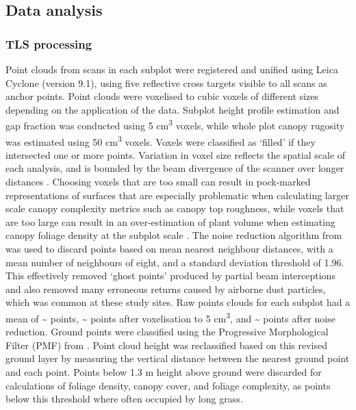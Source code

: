 \documentclass[11pt,a4paper]{article}
\begin{document}
\subsection{Data analysis}

\subsubsection{TLS processing}

Point clouds from scans in each subplot were registered and unified using Leica Cyclone (version 9.1), using five reflective cross targets visible to all scans as anchor points. Point clouds were voxelised to cubic voxels of different sizes depending on the application of the data. Subplot height profile estimation and gap fraction was conducted using 5 cm\textsuperscript{3} voxels, while whole plot canopy rugosity was estimated using 50 cm\textsuperscript{3} voxels. Voxels were classified as `filled' if they intersected one or more points. Variation in voxel size reflects the spatial scale of each analysis, and is bounded by the beam divergence of the scanner over longer distances \citep{Cifuentes2014}. Choosing voxels that are too small can result in pock-marked representations of surfaces that are especially problematic when calculating larger scale canopy complexity metrics such as canopy top roughness, while voxels that are too large can result in an over-estimation of plant volume when estimating canopy foliage density at the subplot scale \citep{Seidel2012, Cifuentes2014}. The noise reduction algorithm from \citet{Rusu2008} was used to discard points based on mean nearest neighbour distances, with a mean number of neighbours of eight, and a standard deviation threshold of 1.96. This effectively removed `ghost points' produced by partial beam interceptions and also removed many erroneous returns caused by airborne dust particles, which was common at these study sites. Raw points clouds for each subplot had a mean of \textasciitilde{}\rawpt{} points, \textasciitilde{}\voxelpt{} points after voxelisation to 5 cm\textsuperscript{3}, and \textasciitilde{}\subpt{} points after noise reduction. Ground points were classified using the Progressive Morphological Filter (PMF) from \citet{Zhang2003}. Point cloud height was reclassified based on this revised ground layer by measuring the vertical distance between the nearest ground point and each point. Points below 1.3 m height above ground were discarded for calculations of foliage density, canopy cover, and foliage complexity, as points below this threshold where often occupied by long grass.
\end{document}
